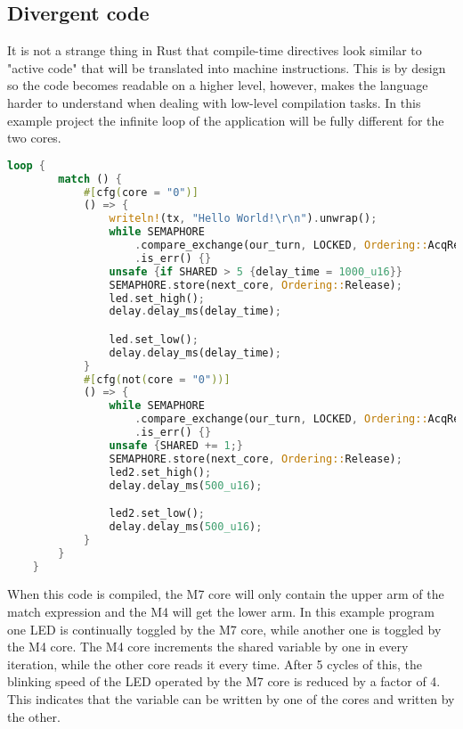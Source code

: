 \subsection{Divergent code}

It is not a strange thing in Rust that compile-time directives look similar to "active code" that will be translated into machine instructions. This is by design so the code becomes readable on a higher level, however, makes the language harder to understand when dealing with low-level compilation tasks. In this example project the infinite loop of the application will be fully different for the two cores.

\begin{lstlisting}[language=Rust,frame=single,float=!ht,style=customrust,label={lst:divergent-code},caption={Example of Diverging Code}]
    loop {
        match () {
            #[cfg(core = "0")]
            () => {
                writeln!(tx, "Hello World!\r\n").unwrap();
                while SEMAPHORE
                    .compare_exchange(our_turn, LOCKED, Ordering::AcqRel, Ordering::Relaxed)
                    .is_err() {}
                unsafe {if SHARED > 5 {delay_time = 1000_u16}}
                SEMAPHORE.store(next_core, Ordering::Release);
                led.set_high();
                delay.delay_ms(delay_time);

                led.set_low();
                delay.delay_ms(delay_time);
            }
            #[cfg(not(core = "0"))]
            () => {
                while SEMAPHORE
                    .compare_exchange(our_turn, LOCKED, Ordering::AcqRel, Ordering::Relaxed)
                    .is_err() {}
                unsafe {SHARED += 1;}
                SEMAPHORE.store(next_core, Ordering::Release);
                led2.set_high();
                delay.delay_ms(500_u16);

                led2.set_low();
                delay.delay_ms(500_u16);
            }
        }
    }
\end{lstlisting}

When this code is compiled, the M7 core will only contain the upper arm of the match expression and the M4 will get the lower arm. In this example program one LED is continually toggled by the M7 core, while another one is toggled by the M4 core. The M4 core increments the shared variable by one in every iteration, while the other core reads it every time. After 5 cycles of this, the blinking speed of the LED operated by the M7 core is reduced by a factor of 4. This indicates that the variable can be written by one of the cores and written by the other.


